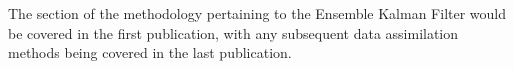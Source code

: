 The section of the methodology pertaining to the Ensemble Kalman Filter would be
covered in the first publication, with any subsequent data assimilation methods
being covered in the last publication.





